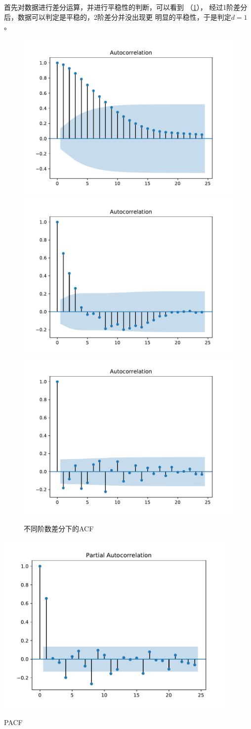 \documentclass[cn]{homework}
\begin{document}
    \problem
    \begin{subproblem}[(\alph*)]
        \item
        首先对数据进行差分运算，并进行平稳性的判断，可以看到
        （\cref{fig:acf}），
        经过1阶差分后，数据可以判定是平稳的，2阶差分并没出现更
        明显的平稳性，于是判定$d=1$。

        \begin{figure}[h]
            \centering
            \includegraphics[width=0.32\linewidth]{acf-d0}
            \includegraphics[width=0.32\linewidth]{acf-d1}
            \includegraphics[width=0.32\linewidth]{acf-d2}
            \caption{不同阶数差分下的ACF}
            \label{fig:acf}
        \end{figure}

        \begin{marginfigure}
            \includegraphics[width=0.9\textwidth]{pacf}
            \caption{PACF}
            \label{fig:pacf}
        \end{marginfigure}


\end{subproblem}
\end{document}
